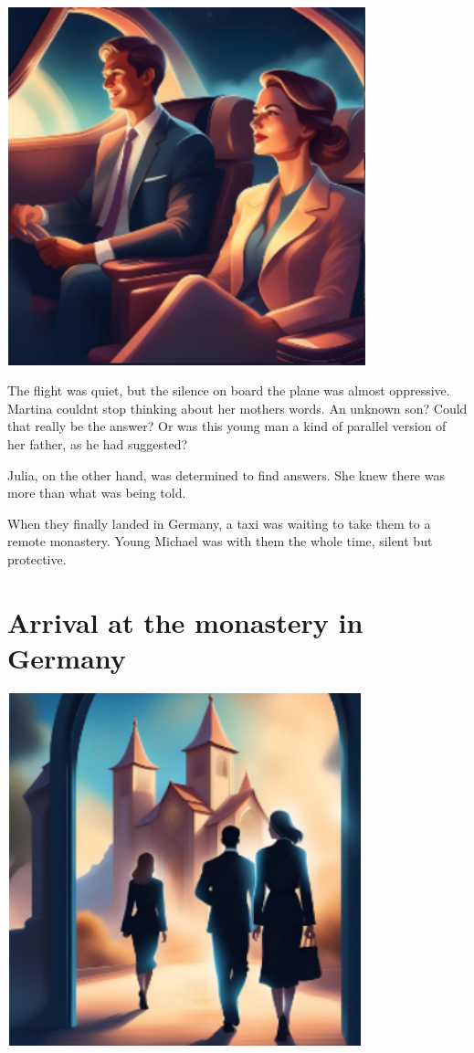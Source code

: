 \documentclass[
]{article}
\begin{document}
\includegraphics[width=4.09531in,height=4.08008in]{media/image9.png}

The flight was quiet, but the silence on board the plane was almost
oppressive. Martina couldn\textquotesingle t stop thinking about her
mother\textquotesingle s words. An unknown son? Could that really be the
answer? Or was this young man a kind of parallel version of her father,
as he had suggested?

Julia, on the other hand, was determined to find answers. She knew there
was more than what was being told.

When they finally landed in Germany, a taxi was waiting to take them to
a remote monastery. Young Michael was with them the whole time, silent
but protective.

\section{Arrival at the monastery in
Germany}\label{arrival-at-the-monastery-in-germany}

\includegraphics[width=4.04843in,height=4.01776in]{media/image5.png}
\end{document}
